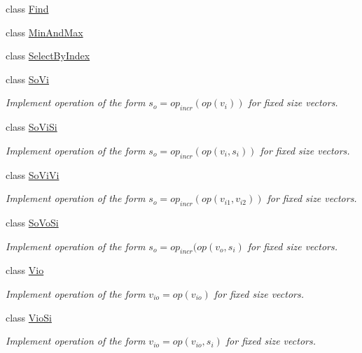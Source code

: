 \begin{DoxyCompactItemize}
\item 
class \hyperlink{classvct_fixed_size_vector_recursive_engines_1_1_find}{Find}
\item 
class \hyperlink{classvct_fixed_size_vector_recursive_engines_1_1_min_and_max}{Min\+And\+Max}
\item 
class \hyperlink{classvct_fixed_size_vector_recursive_engines_1_1_select_by_index}{Select\+By\+Index}
\item 
class \hyperlink{classvct_fixed_size_vector_recursive_engines_1_1_so_vi}{So\+Vi}
\begin{DoxyCompactList}\small\item\em Implement operation of the form $s_o = op_{incr}(op(v_i))$ for fixed size vectors. \end{DoxyCompactList}\item 
class \hyperlink{classvct_fixed_size_vector_recursive_engines_1_1_so_vi_si}{So\+Vi\+Si}
\begin{DoxyCompactList}\small\item\em Implement operation of the form $s_o = op_{incr}(op(v_i, s_i))$ for fixed size vectors. \end{DoxyCompactList}\item 
class \hyperlink{classvct_fixed_size_vector_recursive_engines_1_1_so_vi_vi}{So\+Vi\+Vi}
\begin{DoxyCompactList}\small\item\em Implement operation of the form $s_o = op_{incr}(op(v_{i1}, v_{i2}))$ for fixed size vectors. \end{DoxyCompactList}\item 
class \hyperlink{classvct_fixed_size_vector_recursive_engines_1_1_so_vo_si}{So\+Vo\+Si}
\begin{DoxyCompactList}\small\item\em Implement operation of the form $s_o = op_{incr}(op(v_o, s_i)$ for fixed size vectors. \end{DoxyCompactList}\item 
class \hyperlink{classvct_fixed_size_vector_recursive_engines_1_1_vio}{Vio}
\begin{DoxyCompactList}\small\item\em Implement operation of the form $v_{io} = op(v_{io})$ for fixed size vectors. \end{DoxyCompactList}\item 
class \hyperlink{classvct_fixed_size_vector_recursive_engines_1_1_vio_si}{Vio\+Si}
\begin{DoxyCompactList}\small\item\em Implement operation of the form $ v_{io} = op(v_{io}, s_i)$ for fixed size vectors. \end{DoxyCompactList}\item 

\end{DoxyCompactItemize}

